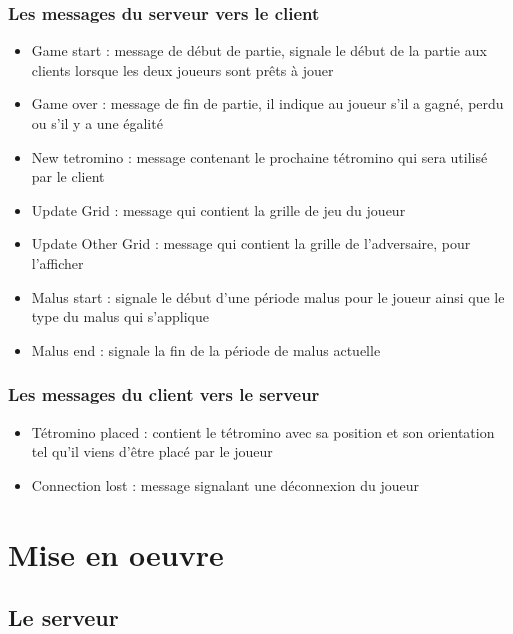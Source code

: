 \documentclass[a4paper, 12pt]{article}
\begin{document}
			\subsubsection{Les messages du serveur vers le client}

				\begin{itemize}
					\item Game start : message de début de partie, signale le début de la partie aux clients lorsque les deux joueurs sont prêts à jouer
					\item Game over : message de fin de partie, il indique au joueur s'il a gagné, perdu ou s'il y a une égalité
					\item New tetromino : message contenant le prochaine tétromino qui sera utilisé par le client
					\item Update Grid : message qui contient la grille de jeu du joueur
					\item Update Other Grid : message qui contient la grille de l'adversaire, pour l'afficher
					\item Malus start : signale le début d'une période malus pour le joueur ainsi que le type du malus qui s'applique
					\item Malus end : signale la fin de la période de malus actuelle
				\end{itemize}

			\subsubsection{Les messages du client vers le serveur}

				\begin{itemize}
					\item Tétromino placed : contient le tétromino avec sa position et son orientation tel qu'il viens d'être placé par le joueur
					\item Connection lost : message signalant une déconnexion du joueur
				\end{itemize}




\section{Mise en oeuvre}
	\subsection{Le serveur}
\end{document}
